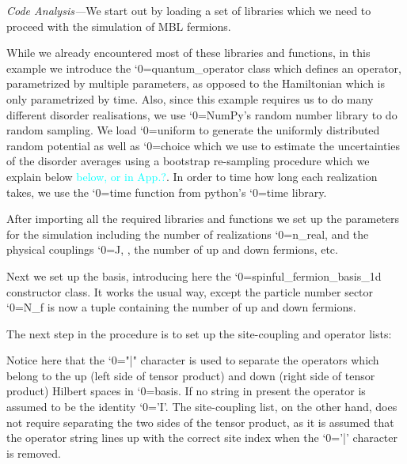 \documentclass{SciPost}
\newcommand\0{\scalebox{-1}[1]{0}}
\let\svttfamily\ttfamily
\renewcommand\ttfamily{\svttfamily\catcode`0=\active }
\renewcommand\texttt{\bgroup\ttfamily\texttthelp}
\def\texttthelp#1{#1\egroup}
\newcommand*{\cyan}{\textcolor{cyan}}
\newcommand{\MBLcode}{example6.py}
\begin{document}
\noindent\emph{Code Analysis---}We start out by loading a set of libraries which we need to proceed with the simulation of MBL fermions. 

While we already encountered most of these libraries and functions, in this example we introduce the \texttt{quantum\_operator} class which defines an operator, parametrized by multiple parameters, as opposed to the Hamiltonian which is only parametrized by time. Also, since this example requires us to do many different disorder realisations, we use \texttt{NumPy}'s random number library to do random sampling. We load \texttt{uniform} to generate the uniformly distributed random potential as well as \texttt{choice} which we use to estimate the uncertainties of the disorder averages using a bootstrap re-sampling procedure which we explain below \cyan{below, or in App.?}. In order to time how long each realization takes, we use the \texttt{time} function from python's \texttt{time} library. 

After importing all the required libraries and functions we set up the parameters for the simulation including the number of realizations \texttt{n\_real}, and the physical couplings \texttt{J}, , the number of up and down fermions, etc.

Next we set up the basis, introducing here the \texttt{spinful\_fermion\_basis\_1d} constructor class. It works the usual way, except the particle number sector \texttt{N\_f} is now a tuple containing the number of up and down fermions. 

The next step in the procedure is to set up the site-coupling and operator lists:

Notice here that the \texttt{"|"} character is used to separate the operators which belong to the up (left side of tensor product) and down (right side of tensor product) Hilbert spaces in \texttt{basis}. If no string in present the operator is assumed to be the identity \texttt{'I'}. The site-coupling list, on the other hand, does not require separating the two sides of the tensor product, as it is assumed that the operator string lines up with the correct site index when the \texttt{'|'} character is removed. 
\end{document}

